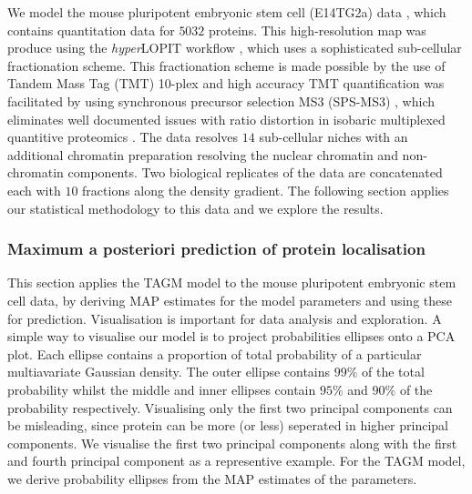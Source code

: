 \documentclass[12pt,english]{article}
\begin{document}
We model the mouse pluripotent embryonic stem cell (E14TG2a) data  \citep{hyper}, which
contains quantitation data for $5032$ proteins. This high-resolution map was
produce using the \textit{hyper}LOPIT workflow \citep{Mulvey:2017}, which uses a sophisticated
sub-cellular fractionation scheme. This fractionation scheme is made possible
by the use of Tandem Mass Tag (TMT) 10-plex and high accuracy TMT quantification
was facilitated by using synchronous precursor selection MS3 (SPS-MS3) \citep{Mcalister::2014},
which eliminates well documented issues with ratio distortion in isobaric multiplexed quantitive proteomics
\citep{Ting:2011}. The data resolves
$14$ sub-cellular niches with an additional chromatin preparation
resolving the nuclear chromatin and non-chromatin components. Two
biological replicates of the data are concatenated each with $10$ fractions
along the density gradient. The following section applies our statistical
methodology to this data and we explore the results.

\subsubsection{Maximum a posteriori prediction of protein localisation}
This section applies the TAGM model to the mouse pluripotent embryonic
stem cell data, by deriving MAP estimates for the model parameters and
using these for prediction.  Visualisation is important for data
analysis and exploration. A simple way to visualise our model is to
project probabilities ellipses onto a PCA plot. Each ellipse contains
a proportion of total probability of a particular multiavariate
Gaussian density.  The outer ellipse contains $99\%$ of the total
probability whilst the middle and inner ellipses contain $95\%$ and
$90\%$ of the probability respectively. Visualising only the first two
principal components can be misleading, since protein can be more (or
less) seperated in higher principal components.  We visualise the
first two principal components along with the first and fourth
principal component as a representive example. For the TAGM model, we
derive probability ellipses from the MAP estimates of the parameters.
\end{document}
